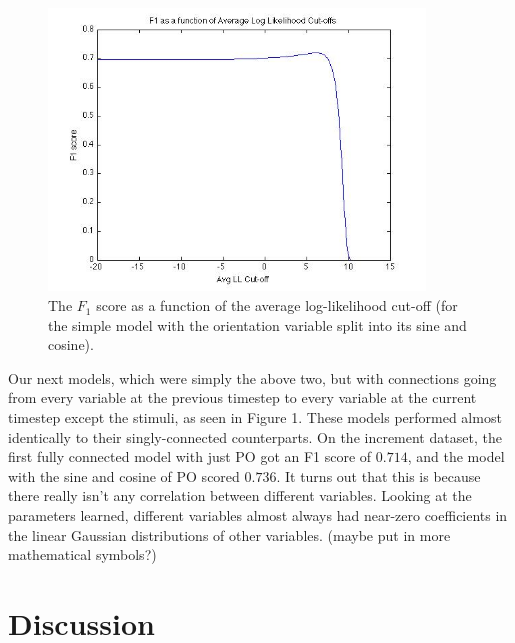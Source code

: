 \documentclass{article} %
\begin{document}
\begin{figure}[t]
  \begin{center}
	\includegraphics[width=10cm]{simple-sincos-llf1.jpg}
	\end{center}
	\caption{The $F_1$ score as a function of the average log-likelihood cut-off (for the simple model with the orientation variable split into its sine and cosine).}
\end{figure}
Our next models, which were simply the above two, but with connections going from every variable at the previous timestep to every variable at the current timestep except the stimuli, as seen in Figure 1. These models performed almost identically to their singly-connected counterparts. On the increment dataset, the first fully connected model with just PO got an F1 score of $0.714$, and the model with the sine and cosine of PO scored $0.736$. It turns out that this is because there really isn’t any correlation between different variables. Looking at the parameters learned, different variables almost always had near-zero coefficients in the linear Gaussian distributions of other variables. (maybe put in more mathematical symbols?)

\section{Discussion}
\end{document}
